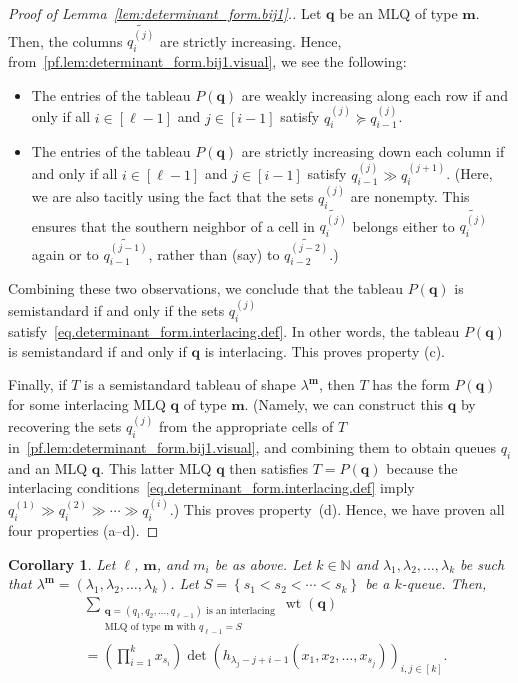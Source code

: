 \documentclass[reqno]{amsart}
\newcommand{\0}{\phantom{c}}
\DeclareMathOperator{\wt}{wt} %
\newcommand{\mm}{\mathbf{m}}
\newcommand{\qq}{\mathbf{q}}
\newcommand{\NN}{\mathbb{N}}
\let\sumnonlimits\sum
\let\prodnonlimits\prod
\renewcommand{\sum}{\sumnonlimits\limits}
\renewcommand{\prod}{\prodnonlimits\limits}
\newcommand{\set}[1]{\left\{ #1 \right\}}
\newcommand{\tup}[1]{\left( #1 \right)}
\newcommand{\ive}[1]{\left[ #1 \right]}
\theoremstyle{plain}
\newtheorem{cor}[thm]{Corollary}
\theoremstyle{definition}
\numberwithin{equation}{section}
\begin{document}
\begin{proof}[Proof of Lemma~\ref{lem:determinant_form.bij1}.]
Let $\qq$ be an MLQ of type $\mm$.
Then, the columns $\widetilde{q_i^{(j)}}$ are strictly increasing. Hence, from~\eqref{pf.lem:determinant_form.bij1.visual}, we see the following:
\begin{itemize}
\item The entries of the tableau $P(\qq)$ are weakly increasing along each row
if and only if all $i \in \ive{\ell-1}$ and $j \in \ive{i-1}$ satisfy
$q_i^{\left(j\right)} \succeq q_{i-1}^{\left(j\right)}$.
\item The entries of the tableau $P(\qq)$ are strictly increasing down each
column if and only if all $i \in \ive{\ell-1}$ and $j \in \ive{i-1}$ satisfy
$q_{i-1}^{\left(j\right)} \gg q_i^{\left(j+1\right)}$.
(Here, we are also tacitly using the fact that the sets
$q_i^{\left(  j\right)  }$ are nonempty. This ensures that the southern
neighbor of a cell in $\widetilde{q_i^{\left(  j\right)  }}$ belongs either
to $\widetilde{q_i^{\left(  j\right)  }}$ again or to
$\widetilde{q_{i-1}^{\left(  j-1\right)  }}$, rather than (say) to
$\widetilde{q_{i-2}^{\left(  j-2\right)  }}$.)
\end{itemize}
Combining these two observations, we conclude that the tableau $P(\qq)$ is semistandard if and only if the sets $q_i^{(j)}$ satisfy~\eqref{eq.determinant_form.interlacing.def}.
In other words, the tableau $P(\qq)$ is semistandard if and only if $\qq$ is interlacing.
This proves property (c).

Finally, if $T$ is a semistandard tableau of shape $\lambda^{\mm}$, then $T$ has the form $P(\qq)$ for some interlacing MLQ $\qq$ of type $\mm$.
(Namely, we can construct this $\qq$ by recovering the sets $q_i^{(j)}$ from the appropriate cells of $T$ in~\eqref{pf.lem:determinant_form.bij1.visual}, and combining them to obtain queues $q_i$ and an MLQ $\qq$.
This latter MLQ $\qq$ then satisfies $T = P(\qq)$ because the interlacing conditions~\eqref{eq.determinant_form.interlacing.def} imply $q_i^{(1)} \gg q_i^{(2)} \gg \cdots \gg q_i^{(i)}$.)
This proves property~(d).
Hence, we have proven all four properties (a--d).
\end{proof}

\begin{cor}
\label{cor:determinant_form.bij1c}
Let $\ell$, $\mm$, and $m_i$ be as above.
Let $k \in \NN$ and $\lambda_1, \lambda_2, \ldots, \lambda_k$ be such that $\lambda^{\mm} = \tup{\lambda_1, \lambda_2, \dotsc, \lambda_k}$.
Let $S = \set{s_1 < s_2 < \cdots < s_k}$ be a $k$-queue.
Then,
\begin{align*}
&  \sum_{\substack{\qq=\tup{q_1,q_2,\ldots,q_{\ell-1}} \text{ is an interlacing}\\\text{MLQ of type $\mm$ with } q_{\ell-1}=S}} \wt(\qq) \\
&  = \left(  \prod_{i=1}^{k}x_{s_i}\right)
    \det\left(h_{\lambda_j-j+i-1}(x_1, x_2, \dotsc, x_{s_j}) \right)_{i, j \in \ive{k}} .
\end{align*}
\end{cor}
\end{document}

